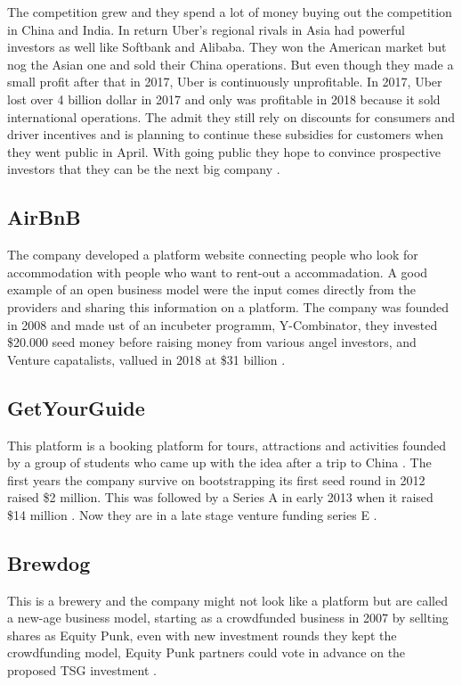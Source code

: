 \documentclass[a4paper, 11pt]{article}
\begin{document}
The competition grew and they spend a lot of money buying out the competition in China and India. In return Uber’s regional rivals in Asia had powerful investors as well like Softbank and Alibaba. They won the American market but nog the Asian one and sold their China operations. But even though they made a small profit after that in 2017, Uber is continuously unprofitable. In 2017, Uber lost over 4 billion dollar in 2017 and only was profitable in 2018 because it sold international operations. The admit they still rely on discounts for consumers and driver incentives and is planning to continue these subsidies for customers when they went public in April. With going public they hope to convince prospective investors that they can be the next big company \cite{griswold}.

\subsection{AirBnB} 
The company developed a platform website connecting people who look for accommodation with people who want to rent-out a accommadation. A good example of an open business model were the input comes directly from the providers and sharing this information on a platform. The company was founded in 2008 and made ust of an incubeter programm, Y-Combinator, they invested \$20.000 seed money before raising money from various angel investors, and Venture capatalists, vallued in 2018 at \$31 billion \citep{mazzarini}.

\subsection{GetYourGuide} 
This platform is a booking platform for tours, attractions and activities founded by a group of students who came up with the idea after a trip to China \citep{getyourguide}. The first years the company survive on bootstrapping its first seed round in 2012 raised \$2 million. This was followed by a Series A in early 2013 when it raised \$14 million \cite{webintravel}. Now they are in a late stage venture funding series E \citep{crunch}.

\subsection{Brewdog} 
This is a brewery and the company might not look like a platform but are called a new-age business model, starting as a crowdfunded business in 2007 by sellting shares as Equity Punk, even with new investment rounds they kept the crowdfunding model, Equity Punk partners could vote in advance on the proposed TSG investment \citep{danziger}.
\end{document}
